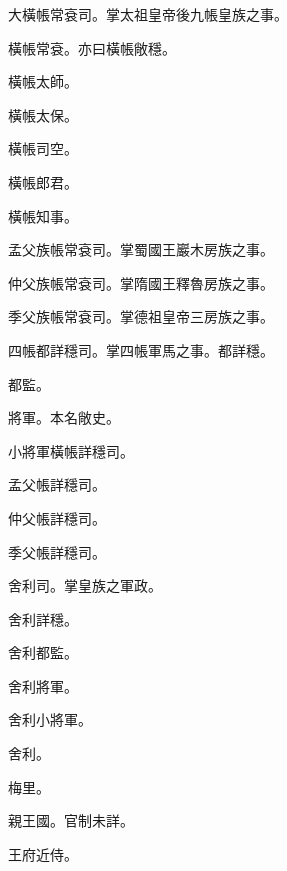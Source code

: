 \begin{pinyinscope}
 大橫帳常袞司。掌太祖皇帝後九帳皇族之事。



 橫帳常袞。亦曰橫帳敞穩。



 橫帳太師。



 橫帳太保。



 橫帳司空。



 橫帳郎君。



 橫帳知事。



 孟父族帳常袞司。掌蜀國王巖木房族之事。



 仲父族帳常袞司。掌隋國王釋魯房族之事。



 季父族帳常袞司。掌德祖皇帝三房族之事。



 四帳都詳穩司。掌四帳軍馬之事。都詳穩。



 都監。



 將軍。本名敞史。



 小將軍橫帳詳穩司。



 孟父帳詳穩司。



 仲父帳詳穩司。



 季父帳詳穩司。



 舍利司。掌皇族之軍政。



 舍利詳穩。



 舍利都監。



 舍利將軍。



 舍利小將軍。



 舍利。



 梅里。



 親王國。官制未詳。



 王府近侍。




\end{pinyinscope}
